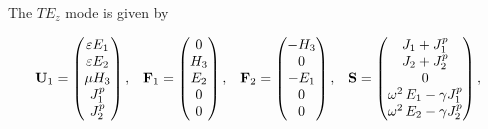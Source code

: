 The $TE_z$ mode is given by

\begin{equation*}
  \begin{array}{ccccc}
    \mathbf{U}_1 = \begin{pmatrix} \varepsilon E_1 \\ \varepsilon E_2 \\ \mu H_3 \\ J^p_1 \\  J^p_2 \end{pmatrix} ,
 &
   \mathbf{F}_1 = \begin{pmatrix} 0 \\ H_3 \\ E_2 \\ 0 \\  0 \end{pmatrix} ,
 &
   \mathbf{F}_2 = \begin{pmatrix} - H_3 \\ 0 \\ -E_1 \\ 0 \\ 0 \end{pmatrix} ,
 &
   \mathbf{S} = \begin{pmatrix} J_1 + J^p_1 \\ J_2+ J^p_2 \\ 0 \\ \omega^2 \, E_1 - \gamma J^p_1 \\  \omega^2 \, E_2 - \gamma J^p_2 \end{pmatrix} ,
  \end{array}
  \:
\end{equation*}

